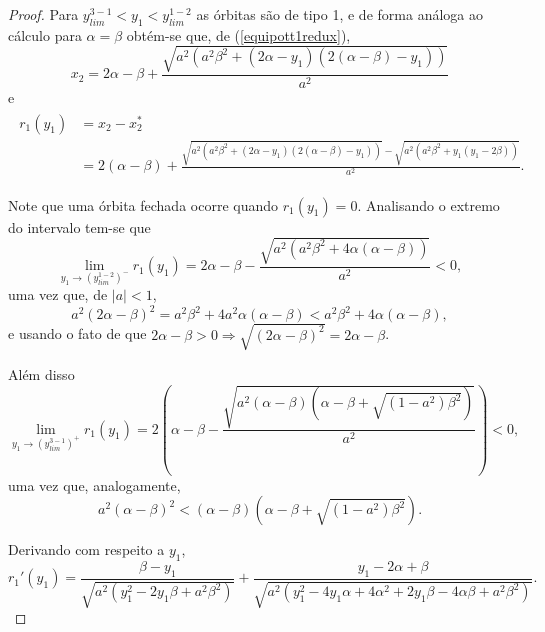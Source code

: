 \begin{proof}
Para $y_{lim}^{3-1}< y_1<y_{lim}^{1-2}$ as órbitas são de tipo 1, e de forma análoga ao cálculo para $\alpha=\beta$ obtém-se que, de (\ref{equipott1redux}),
$$
x_2=
2\alpha-\beta+\frac{\sqrt{ a^2( a^2\beta^2 +  (2\alpha-y_1) (2(\alpha-\beta)-y_1))}}{ a^2}
$$
e
\begin{gather}
\begin{aligned}
\label{r_1}
r_1(y_1)&=x_2-x_2^*
\\&=
2(\alpha-\beta)+\frac{\sqrt{ a^2( a^2\beta^2 +  (2\alpha-y_1) (2(\alpha-\beta)-y_1))}-\sqrt{ a^2(a^2 \beta^2 +  y_1 (y_1 - 2 \beta))}}{ a^2}.\nonumber
\end{aligned}
\end{gather}

Note que uma órbita fechada ocorre quando $r_1(y_1)=0$. Analisando o extremo do intervalo tem-se que
\begin{equation}
\label{r_1-2}
    \lim_{y_1\rightarrow (y_{lim}^{1-2})^-}r_1(y_1)=2\alpha-\beta-\frac{\sqrt{ a^2(a^2 \beta^2 +  4\alpha (\alpha - \beta))}}{ a^2}<0,
    \end{equation}
uma vez que, de $|a|<1$,
$$
a^2(2\alpha-\beta)^2=a^2\beta^2+4a^2\alpha(\alpha-\beta)<a^2 \beta^2 +  4\alpha (\alpha - \beta),
$$
e usando o fato de que $2\alpha-\beta>0\Rightarrow\sqrt{(2\alpha-\beta)^2}=2\alpha-\beta$.

Além disso
\begin{equation}
\label{r_3-1}
\lim_{y_1\to (y_{lim}^{3-1})^+}r_1(y_1)=2\left(\alpha-\beta-\frac{\sqrt{a^{2}(\alpha-\beta)\left(\alpha-\beta+\sqrt{\left(1-a^{2}\right) \beta^{2}}\right)}}{a^{2}}\right)<0,
\end{equation}
uma vez que, analogamente,
$$
a^2(\alpha-\beta)^2<(\alpha-\beta)\left(\alpha-\beta+\sqrt{\left(1-a^{2}\right) \beta^{2}}\right).
$$

Derivando com respeito a $y_1$,
$$
r_1'(y_1)=\frac{\beta-y_1}{\sqrt{a^2 (y_1^2 - 2 y_1 \beta + a^2 \beta^2)}} + \frac{y_1 - 2 \alpha + \beta}{\sqrt{a^2 (y_1^2 - 4 y_1 \alpha + 4 \alpha^2 + 2 y_1 \beta - 4 \alpha \beta + a^2 \beta^2)}}.
$$


\end{proof}
